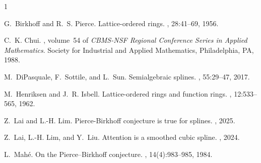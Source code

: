 \documentclass[11pt]{amsart}
\theoremstyle{remark}
\begin{document}
\begin{thebibliography}{1}

G.~Birkhoff and R.~S. Pierce.
\newblock Lattice-ordered rings.
, 28:41--69, 1956.

C.~K. Chui.
, volume~54 of {\em CBMS-NSF Regional
  Conference Series in Applied Mathematics}.
\newblock Society for Industrial and Applied Mathematics, Philadelphia, PA,
  1988.

M.~DiPasquale, F.~Sottile, and L.~Sun.
\newblock Semialgebraic splines.
, 55:29--47, 2017.

M.~Henriksen and J.~R. Isbell.
\newblock Lattice-ordered rings and function rings.
, 12:533--565, 1962.

Z.~Lai and L.-H. Lim.
\newblock Pierce-Birkhoff conjecture is true for splines.
, 2025.

Z.~Lai, L.-H. Lim, and Y.~Liu.
\newblock Attention is a smoothed cubic spline.
, 2024.

L.~Mah\'e.
\newblock On the {P}ierce--{B}irkhoff conjecture.
, 14(4):983--985, 1984.

\end{thebibliography}
\end{document}
